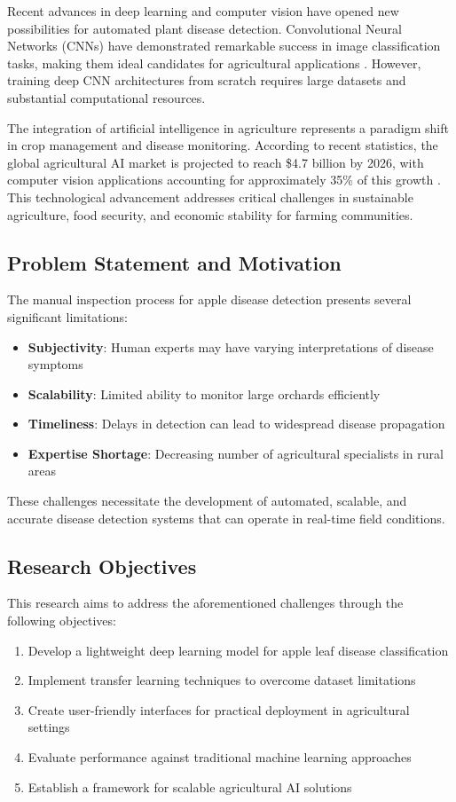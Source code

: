 \documentclass[conference,10pt,letterpaper]{IEEEtran}
\begin{document}
Recent advances in deep learning and computer vision have opened new possibilities for automated plant disease detection. Convolutional Neural Networks (CNNs) have demonstrated remarkable success in image classification tasks, making them ideal candidates for agricultural applications \cite{ref2}. However, training deep CNN architectures from scratch requires large datasets and substantial computational resources.

The integration of artificial intelligence in agriculture represents a paradigm shift in crop management and disease monitoring. According to recent statistics, the global agricultural AI market is projected to reach \$4.7 billion by 2026, with computer vision applications accounting for approximately 35\% of this growth \cite{ref3}. This technological advancement addresses critical challenges in sustainable agriculture, food security, and economic stability for farming communities.

\subsection{Problem Statement and Motivation}

The manual inspection process for apple disease detection presents several significant limitations:
\begin{itemize}
\item \textbf{Subjectivity}: Human experts may have varying interpretations of disease symptoms
\item \textbf{Scalability}: Limited ability to monitor large orchards efficiently
\item \textbf{Timeliness}: Delays in detection can lead to widespread disease propagation
\item \textbf{Expertise Shortage}: Decreasing number of agricultural specialists in rural areas
\end{itemize}

These challenges necessitate the development of automated, scalable, and accurate disease detection systems that can operate in real-time field conditions.

\subsection{Research Objectives}

This research aims to address the aforementioned challenges through the following objectives:
\begin{enumerate}
\item Develop a lightweight deep learning model for apple leaf disease classification
\item Implement transfer learning techniques to overcome dataset limitations
\item Create user-friendly interfaces for practical deployment in agricultural settings
\item Evaluate performance against traditional machine learning approaches
\item Establish a framework for scalable agricultural AI solutions
\end{enumerate}
\end{document}
